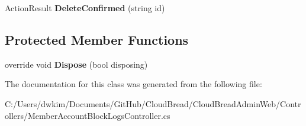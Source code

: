 \begin{DoxyCompactItemize}
\item 
Action\+Result {\bfseries Delete\+Confirmed} (string id)\hypertarget{class_cloud_bread_admin_web_1_1_controllers_1_1_member_account_block_logs_controller_a3953e3d9423bb7007b0c8cf9cd707183}{}\label{class_cloud_bread_admin_web_1_1_controllers_1_1_member_account_block_logs_controller_a3953e3d9423bb7007b0c8cf9cd707183}

\end{DoxyCompactItemize}
\subsection*{Protected Member Functions}
\begin{DoxyCompactItemize}
\item 
override void {\bfseries Dispose} (bool disposing)\hypertarget{class_cloud_bread_admin_web_1_1_controllers_1_1_member_account_block_logs_controller_a56ca84b93fcf08799c2c42d5af114576}{}\label{class_cloud_bread_admin_web_1_1_controllers_1_1_member_account_block_logs_controller_a56ca84b93fcf08799c2c42d5af114576}

\end{DoxyCompactItemize}


The documentation for this class was generated from the following file\+:\begin{DoxyCompactItemize}
\item 
C\+:/\+Users/dwkim/\+Documents/\+Git\+Hub/\+Cloud\+Bread/\+Cloud\+Bread\+Admin\+Web/\+Controllers/Member\+Account\+Block\+Logs\+Controller.\+cs\end{DoxyCompactItemize}
